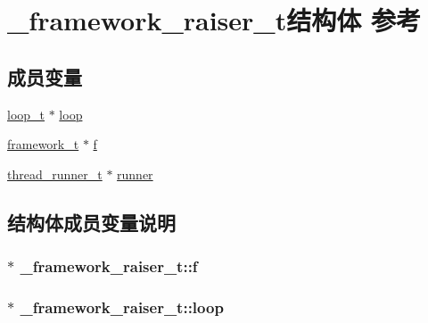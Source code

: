 \hypertarget{a00012}{}\section{\+\_\+framework\+\_\+raiser\+\_\+t结构体 参考}
\label{a00012}
\subsection*{成员变量}
\begin{DoxyCompactItemize}
\item 
\hyperlink{a00050_a9c3ad1cd2de83e09f3a7b59fa82c94ee_a9c3ad1cd2de83e09f3a7b59fa82c94ee}{loop\+\_\+t} $\ast$ \hyperlink{a00012_ad7bf02f3888bf4d1640658b952e61f21_ad7bf02f3888bf4d1640658b952e61f21}{loop}
\item 
\hyperlink{a00050_a6149d769f6f07ed14a40a271c95d8463_a6149d769f6f07ed14a40a271c95d8463}{framework\+\_\+t} $\ast$ \hyperlink{a00012_adfe3d046ff8a8402012e673e3532f06c_adfe3d046ff8a8402012e673e3532f06c}{f}
\item 
\hyperlink{a00050_a9054159cde2f926ef61c28ce1e555199_a9054159cde2f926ef61c28ce1e555199}{thread\+\_\+runner\+\_\+t} $\ast$ \hyperlink{a00012_ac0f82106ba3dd69995f8ba75e8ac9c45_ac0f82106ba3dd69995f8ba75e8ac9c45}{runner}
\end{DoxyCompactItemize}


\subsection{结构体成员变量说明}
\hypertarget{a00012_adfe3d046ff8a8402012e673e3532f06c_adfe3d046ff8a8402012e673e3532f06c}{}
\subsubsection[{f}]{$\ast$ \+\_\+framework\+\_\+raiser\+\_\+t\+::f}\label{a00012_adfe3d046ff8a8402012e673e3532f06c_adfe3d046ff8a8402012e673e3532f06c}
\hypertarget{a00012_ad7bf02f3888bf4d1640658b952e61f21_ad7bf02f3888bf4d1640658b952e61f21}{}
\subsubsection[{loop}]{$\ast$ \+\_\+framework\+\_\+raiser\+\_\+t\+::loop}\label{a00012_ad7bf02f3888bf4d1640658b952e61f21_ad7bf02f3888bf4d1640658b952e61f21}
\hypertarget{a00012_ac0f82106ba3dd69995f8ba75e8ac9c45_ac0f82106ba3dd69995f8ba75e8ac9c45}{}
